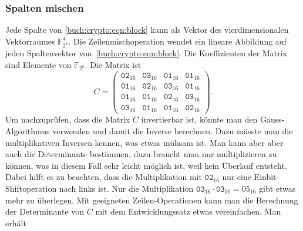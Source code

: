 \subsubsection{Spalten mischen}
Jede Spalte von \eqref{buch:crypto:eqn:block} kann als Vektor des
vierdimensionalen Vektorraumes $\mathbb{F}_{2^8}^4$.
Die Zeilenmischoperation wendet ein lineare Abbildung auf jeden
Spaltenvektor von~\eqref{buch:crypto:eqn:block}.
Die Koeffizienten der Matrix sind Elemente von $\mathbb{F}_{2^8}$.
Die Matrix ist
\[
C=\begin{pmatrix}
\texttt{02}_{16}&\texttt{03}_{16}&\texttt{01}_{16}&\texttt{01}_{16}\\
\texttt{01}_{16}&\texttt{02}_{16}&\texttt{03}_{16}&\texttt{01}_{16}\\
\texttt{01}_{16}&\texttt{01}_{16}&\texttt{02}_{16}&\texttt{03}_{16}\\
\texttt{03}_{16}&\texttt{01}_{16}&\texttt{01}_{16}&\texttt{02}_{16}
\end{pmatrix}.
\]
Um nachzuprüfen, dass die Matrix $C$ invertierbar ist, könnte man den
Gauss-Algorithmus verwenden und damit die Inverse berechnen.
Dazu müsste man die multiplikativen Inversen kennen, was etwas mühsam
ist.
Man kann aber aber auch die Determinante bestimmen, dazu braucht man
nur multiplizieren zu können, was in diesem Fall sehr leicht möglich ist,
weil kein Überlauf entsteht.
Dabei hilft es zu beachten, dass die Multiplikation mit $\texttt{02}_{16}$
nur eine Einbit-Shiftoperation nach links ist.
Nur die Multiplikation $\texttt{03}_{16}\cdot\texttt{03}_{16}=\text{05}_{16}$
gibt etwas mehr zu überlegen.
Mit geeigneten Zeilen-Operationen kann man die Berechnung der Determinante
von $C$ mit dem Entwicklungssatz etwas vereinfachen.
Man erhält
